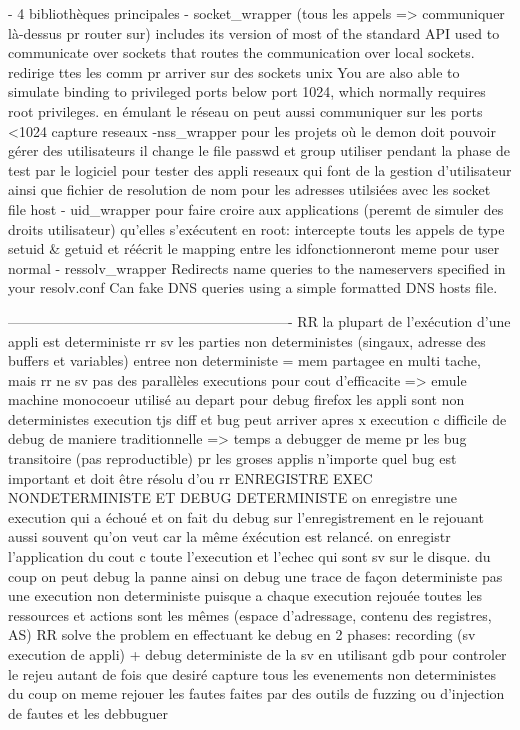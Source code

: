 - 4 bibliothèques principales
- socket\_wrapper (tous les appels => communiquer là-dessus pr router sur)
includes its version of most of the standard API used to communicate over sockets that routes the communication over local sockets.
redirige ttes les comm pr arriver sur des sockets unix
You are also able to simulate binding to privileged ports below port 1024, which normally requires root privileges.
en émulant le réseau on peut aussi communiquer sur les ports <1024
capture reseaux
-nss\_wrapper pour les projets où le demon doit pouvoir gérer des utilisateurs
il change le file passwd et group utiliser pendant la phase de test par le logiciel
pour tester des appli reseaux qui font de la gestion d'utilisateur ainsi que fichier de resolution de nom pour les adresses utilsiées avec les socket file host
- uid\_wrapper pour faire croire aux applications (peremt de simuler des droits utilisateur) qu'elles s'exécutent en root:
intercepte touts les appels de type setuid & getuid et réécrit le mapping entre les idfonctionneront meme pour user normal 
- ressolv\_wrapper
Redirects name queries to the nameservers specified in your resolv.conf
Can fake DNS queries using a simple formatted DNS hosts file.


-------------------------------------------------------------
RR
la plupart de l'exécution d'une appli est deterministe
rr sv les parties non deterministes (singaux, adresse des buffers et variables)
entree non deterministe = mem partagee en multi tache, mais rr ne sv pas des parallèles executions pour cout d'efficacite => emule machine monocoeur
utilisé au depart pour debug firefox
les appli sont non deterministes execution tjs diff et bug peut arriver apres x execution c difficile de debug de maniere traditionnelle => temps a debugger de meme pr les bug transitoire (pas reproductible) pr les groses applis n'importe quel bug est important et doit être résolu d'ou rr
ENREGISTRE EXEC NONDETERMINISTE ET DEBUG DETERMINISTE
on enregistre une execution qui a échoué et on fait du debug sur l'enregistrement en le rejouant aussi souvent qu'on veut car la même éxécution est relancé.
on enregistr l'application du cout c toute l'execution et l'echec qui sont sv sur le disque.  du coup on peut debug la panne
ainsi on debug une trace de façon deterministe pas une execution non deterministe puisque a chaque execution rejouée toutes les ressources et actions sont les mêmes (espace d'adressage, contenu des registres, AS)
RR solve the problem en effectuant ke debug en 2 phases: recording (sv execution de appli) + debug deterministe de la sv en utilisant gdb pour controler le rejeu autant de fois que desiré
capture tous les evenements non deterministes
du coup on meme rejouer les fautes faites par des outils de fuzzing ou d'injection de fautes et les debbuguer


